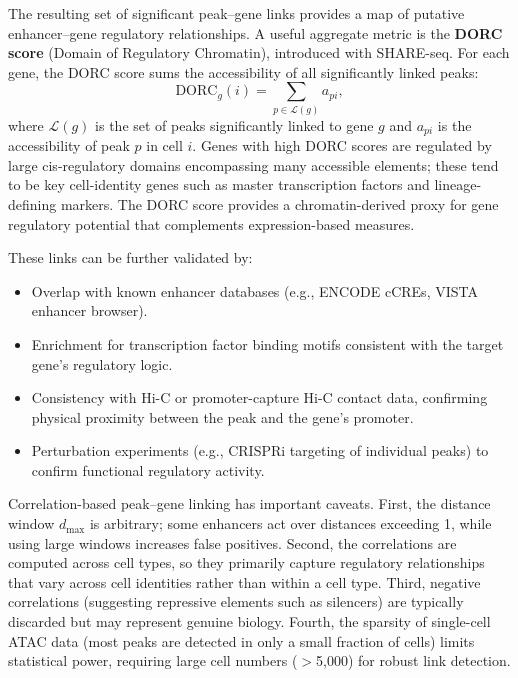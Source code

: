 The resulting set of significant peak--gene links provides a map of putative enhancer--gene regulatory relationships. A useful aggregate metric is the \textbf{DORC score} (Domain of Regulatory Chromatin), introduced with SHARE-seq. For each gene, the DORC score sums the accessibility of all significantly linked peaks:
\begin{equation}
  \text{DORC}_g(i) = \sum_{p \in \mathcal{L}(g)} a_{pi},
  \label{eq:multiomics:dorc}
\end{equation}
where $\mathcal{L}(g)$ is the set of peaks significantly linked to gene $g$ and $a_{pi}$ is the accessibility of peak $p$ in cell $i$. Genes with high DORC scores are regulated by large cis-regulatory domains encompassing many accessible elements; these tend to be key cell-identity genes such as master transcription factors and lineage-defining markers. The DORC score provides a chromatin-derived proxy for gene regulatory potential that complements expression-based measures.

These links can be further validated by:
\begin{itemize}[itemsep=2pt]
  \item Overlap with known enhancer databases (e.g., ENCODE cCREs, VISTA enhancer browser).
  \item Enrichment for transcription factor binding motifs consistent with the target gene's regulatory logic.
  \item Consistency with Hi-C or promoter-capture Hi-C contact data, confirming physical proximity between the peak and the gene's promoter.
  \item Perturbation experiments (e.g., CRISPRi targeting of individual peaks) to confirm functional regulatory activity.
\end{itemize}

\begin{warningbox}
Correlation-based peak--gene linking has important caveats. First, the distance window $d_{\max}$ is arbitrary; some enhancers act over distances exceeding 1\megabase{}, while using large windows increases false positives. Second, the correlations are computed across cell types, so they primarily capture regulatory relationships that vary across cell identities rather than within a cell type. Third, negative correlations (suggesting repressive elements such as silencers) are typically discarded but may represent genuine biology. Fourth, the sparsity of single-cell ATAC data (most peaks are detected in only a small fraction of cells) limits statistical power, requiring large cell numbers ($>$5{,}000) for robust link detection.
\end{warningbox}

